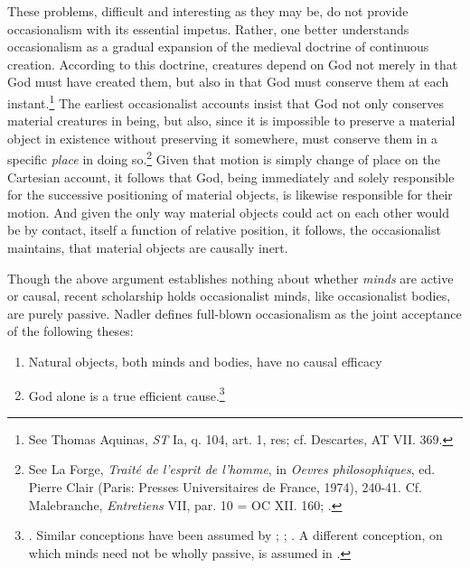 \documentclass[]{article}
\begin{document}
These problems, difficult and interesting as they may be, do not provide occasionalism with its essential impetus. Rather, one better understands occasionalism as a gradual expansion of the medieval doctrine of continuous creation. According to this doctrine, creatures depend on God not merely in that God must have created them, but also in that God must conserve them at each instant.\footnote{See Thomas Aquinas, \emph{ST} Ia, q. 104, art. 1, res; cf. Descartes, AT VII. 369.} The earliest occasionalist accounts insist that God not only conserves material creatures in being, but also, since it is impossible to preserve a material object in existence without preserving it somewhere, must conserve them in a specific \emph{place} in doing so.\footnote{See La Forge, \emph{Traité de l'esprit de l'homme}, in \emph{Oevres philosophiques}, ed. Pierre Clair (Paris: Presses Universitaires de France, 1974), 240-41. Cf. Malebranche, \emph{Entretiens} VII, par. 10 = OC XII. 160; \autocite{Nadler1998}.} Given that motion is simply change of place on the Cartesian account, it follows that God, being immediately and solely responsible for the successive positioning of material objects, is likewise responsible for their motion. And given the only way material objects could act on each other would be by contact, itself a function of relative position, it follows, the occasionalist maintains, that material objects are causally inert.

Though the above argument establishes nothing about whether \emph{minds} are active or causal, recent scholarship holds occasionalist minds, like occasionalist bodies, are purely passive. Nadler defines full-blown occasionalism as the joint acceptance of the following theses:

\begin{enumerate}
	\item Natural objects, both minds and bodies, have no causal efficacy
	\item God alone is a true efficient cause.\footnote{\autocite[39]{Nadler2005}. Similar conceptions have been assumed by \autocite[45-46]{Pyle2003}; \autocite[174]{Battail1973}; \autocite[288]{Winkler2011}. A different conception, on which minds need not be wholly passive, is assumed in \autocite[358]{Radner1993}.}
\end{enumerate}
\end{document}

